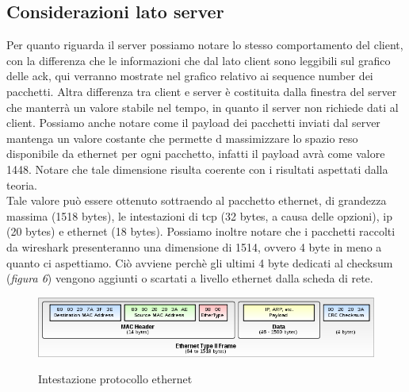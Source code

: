 \documentclass[12pt]{article}
\begin{document}
\subsection{Considerazioni lato server}
Per quanto riguarda il server possiamo notare lo stesso comportamento del client, con la differenza che le informazioni che dal lato client sono leggibili sul grafico delle ack, qui verranno mostrate nel grafico relativo ai sequence number dei pacchetti. Altra differenza tra client e server è costituita dalla finestra del server che manterrà un valore stabile nel tempo, in quanto il server non richiede dati al client. Possiamo anche notare come il payload dei pacchetti inviati dal server mantenga un valore costante che permette d massimizzare lo spazio reso disponibile da ethernet per ogni pacchetto, infatti il payload avrà come valore 1448.
Notare che tale dimensione risulta coerente con i risultati aspettati dalla teoria.\\
Tale valore può essere ottenuto sottraendo al pacchetto ethernet, di grandezza massima (1518 bytes), le intestazioni di tcp (32 bytes, a causa delle opzioni), ip (20 bytes) e ethernet (18 bytes).
Possiamo inoltre notare che i pacchetti raccolti da wireshark presenteranno una dimensione di 1514, ovvero 4 byte in meno a quanto ci aspettiamo. Ciò avviene perchè gli ultimi 4 byte dedicati al checksum (\textit{figura 6}) vengono aggiunti o scartati a livello ethernet dalla scheda di rete.

\begin{figure}[h]
	\center
	\includegraphics[width=\linewidth]{head_ethernet.png}
	\label{eth}
	\caption{Intestazione protocollo ethernet}
\end{figure}

\newpage
\end{document}

